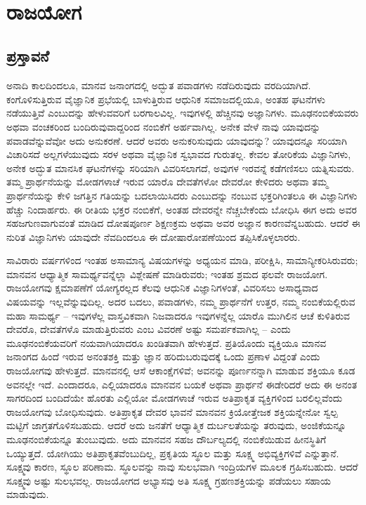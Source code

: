 

\newpage

~\thispagestyle{empty}

\newpage

\part{ರಾಜಯೋಗ}

\chapter{ಪ್ರಸ್ತಾವನೆ}

ಅನಾದಿ ಕಾಲದಿಂದಲೂ, ಮಾನವ ಜನಾಂಗದಲ್ಲಿ ಅದ್ಭುತ ಪವಾಡಗಳು ನಡೆದಿರುವುದು ವರದಿಯಾಗಿದೆ. ಕಂಗೊಳಿಸುತ್ತಿರುವ ವೈಜ್ಞಾನಿಕ ಪ್ರಭೆಯಲ್ಲಿ ಬಾಳುತ್ತಿರುವ ಆಧುನಿಕ ಸಮಾಜದಲ್ಲಿಯೂ, ಅಂತಹ ಘಟನೆಗಳು ನಡೆಯುತ್ತಿವೆ ಎಂಬುದನ್ನು ಹೇಳುವವರಿಗೆ ಬರಗಾಲವಿಲ್ಲ. ಇವುಗಳಲ್ಲಿ ಹೆಚ್ಚಿನವು ಅಜ್ಞಾನಿಗಳು. ಮೂಢನಂಬಿಕೆಯವರು ಅಥವಾ ವಂಚಕರಿಂದ ಬಂದಿರುವುವಾದ್ದರಿಂದ ನಂಬಿಕೆಗೆ ಅರ್ಹವಾಗಿಲ್ಲ. ಅನೇಕ ವೇಳೆ ನಾವು ಯಾವುದನ್ನು ಪವಾಡವೆನ್ನುವೆವೋ ಅದು ಅನುಕರಣೆ. ಆದರೆ ಅವರು ಅನುಕರಿಸುವುದು ಯಾವುದನ್ನು? ಯಾವುದನ್ನೂ ಸರಿಯಾಗಿ ವಿಚಾರಿಸದೆ ಅಲ್ಲಗಳೆಯುವುದು ಸರಳ ಅಥವಾ ವೈಜ್ಞಾನಿಕ ಸ್ವಭಾವದ ಗುರುತಲ್ಲ. ಕೇವಲ ತೋರಿಕೆಯ ವಿಜ್ಞಾನಿಗಳು, ಅನೇಕ ಅದ್ಭುತ ಮಾನಸಿಕ ಘಟನೆಗಳನ್ನು ಸರಿಯಾಗಿ ವಿವರಿಸಲಾಗದೆ, ಅವುಗಳ ಇರವನ್ನೆ ಕಡೆಗಣಿಸಲು ಯತ್ನಿಸುವರು. ತಮ್ಮ ಪ್ರಾರ್ಥನೆಯನ್ನು ಮೋಡಗಳಾಚೆ ಇರುವ ಯಾರೊ ದೇವತೆಗಳೋ ದೇವರೋ ಕೇಳಿದರು ಅಥವಾ ತಮ್ಮ ಪ್ರಾರ್ಥನೆಯನ್ನು ಕೇಳಿ ಜಗತ್ತಿನ ಗತಿಯನ್ನು ಬದಲಾಯಿಸಿದರು ಎಂಬುದನ್ನು ನಂಬುವ ಭಕ್ತರಿಗಿಂತಲೂ ಈ ವಿಜ್ಞಾನಿಗಳು ಹೆಚ್ಚು ನಿಂದಾರ್ಹರು. ಈ ರೀತಿಯ ಭಕ್ತರ ನಂಬಿಕೆಗೆ, ಅಂತಹ ದೇವರನ್ನೇ ನೆಚ್ಚಬೇಕೆಂದು ಬೋಧಿಸಿ ಈಗ ಅದು ಅವರ ಸಹಜಗುಣವಾಗುವಂತೆ ಮಾಡಿದ ದೋಷಪೂರ್ಣ ಶಿಕ್ಷಣಕ್ರಮ ಅಥವಾ ಅವರ ಅಜ್ಞಾನ ಕಾರಣವೆನ್ನಬಹುದು. ಆದರೆ ಈ ನುರಿತ ವಿಜ್ಞಾನಿಗಳು ಯಾವುದೇ ನೆವದಿಂದಲೂ ಈ ದೋಷಾರೋಪಣೆಯಿಂದ ತಪ್ಪಿಸಿಕೊಳ್ಳಲಾರರು. 

\vskip 5pt

ಸಾವಿರಾರು ವರ್ಷಗಳಿಂದ ಇಂತಹ ಅಸಾಮಾನ್ಯ ವಿಷಯಗಳನ್ನು ಅಧ್ಯಯನ ಮಾಡಿ, ಪರೀಕ್ಷಿಸಿ, ಸಾಮಾನ್ಯೀಕರಿಸಿರುವರು; ಮಾನವನ ಆಧ್ಯಾತ್ಮಿಕ ಸಾಮರ್ಥ್ಯವನ್ನೆಲ್ಲಾ ವಿಶ್ಲೇಷಣೆ ಮಾಡಿರುವರು; ಇಂತಹ ಶ್ರಮದ ಫಲವೇ ರಾಜಯೋಗ. ರಾಜಯೋಗವು ಕ್ಷಮಾಪಣೆಗೆ ಯೋಗ್ಯರಲ್ಲದ ಕೆಲವು ಆಧುನಿಕ ವಿಜ್ಞಾನಿಗಳಂತೆ, ವಿವರಿಸಲು ಅಸಾಧ್ಯವಾದ ವಿಷಯವನ್ನು ಇಲ್ಲವೆನ್ನುವುದಿಲ್ಲ. ಅದರ ಬದಲು, ಪವಾಡಗಳು, ನಮ್ಮ ಪ್ರಾರ್ಥನೆಗೆ ಉತ್ತರ, ನಮ್ಮ ನಂಬಿಕೆಯಲ್ಲಿರುವ ಮಹಾ ಸಾಮರ್ಥ್ಯ – ಇವುಗಳೆಲ್ಲ ವಾಸ್ತವಿಕವಾಗಿ ನಿಜವಾದರೂ ಇವುಗಳನ್ನೆಲ್ಲ ಯಾರೊ ಮುಗಿಲಿನ ಆಚೆ ಕುಳಿತಿರುವ ದೇವರೊ, ದೇವತೆಗಳೊ ಮಾಡುತ್ತಿರುವರು ಎಂಬ ವಿವರಣೆ ಅಷ್ಟು ಸಮರ್ಪಕವಾಗಿಲ್ಲ – ಎಂದು ಮೂಢನಂಬಿಕೆಯವರಿಗೆ ನಯವಾಗಿಯಾದರೂ ಖಂಡಿತವಾಗಿ ಹೇಳುತ್ತದೆ. ಪ್ರತಿಯೊಂದು ವ್ಯಕ್ತಿಯೂ ಮಾನವ ಜನಾಂಗದ ಹಿಂದೆ ಇರುವ ಅನಂತಶಕ್ತಿ ಮತ್ತು ಜ್ಞಾನ ಹರಿದುಬರುವುದಕ್ಕೆ ಒಂದು ಪ್ರಣಾಳ ವಿದ್ದಂತೆ ಎಂದು ರಾಜಯೋಗವು ಹೇಳುತ್ತದೆ. ಮಾನವನಲ್ಲಿ ಆಸೆ ಆಕಾಂಕ್ಷೆಗಳಿವೆ; ಅವನನ್ನು ಪೂರ್ಣನನ್ನಾಗಿ ಮಾಡುವ ಶಕ್ತಿಯೂ ಕೂಡ ಅವನಲ್ಲೇ ಇದೆ. ಎಂದಾದರೂ, ಎಲ್ಲಿಯಾದರೂ ಮಾನವನ ಬಯಕೆ ಅಥವಾ ಪ್ರಾರ್ಥನೆ ಈಡೇರಿದರೆ ಅದು ಈ ಅನಂತ ಸಾಗರದಿಂದ ಬಂದಿದೆಯೇ ಹೊರತು ಎಲ್ಲಿಯೋ ಮೋಡಗಳಾಚೆ ಇರುವ ಅತಿಪ್ರಾಕೃತ ವ್ಯಕ್ತಿಗಳಿಂದ ಬರಲಿಲ್ಲವೆಂದು ರಾಜಯೋಗವು ಬೋಧಿಸುವುದು. ಅತಿಪ್ರಾಕೃತ ದೇವರ ಭಾವನೆ ಮಾನವನ ಕ್ರಿಯೋತ್ತೇಜಕ ಶಕ್ತಿಯನ್ನೇನೋ ಸ್ವಲ್ಪ ಮಟ್ಟಿಗೆ ಜಾಗ್ರತಗೊಳಿಸಬಹುದು. ಆದರೆ ಅದು ಜನತೆಗೆ ಆಧ್ಯಾತ್ಮಿಕ ದುರ್ಬಲತೆಯನ್ನು ತರುವುದು, ಅಂಜಿಕೆಯನ್ನೂ ಮೂಢನಂಬಿಕೆಯನ್ನೂ ತುಂಬುವುದು. ಅದು ಮಾನವನ ಸಹಜ ದೌರ್ಬಲ್ಯದಲ್ಲಿ ನಂಬಿಕೆಯಿಡುವ ಹೀನಸ್ಥಿತಿಗೆ ಒಯ್ಯುತ್ತದೆ. ಯೋಗಿಯು ಅತಿಪ್ರಾಕೃತವೆಂಬುದಿಲ್ಲ, ಪ್ರಕೃತಿಯ ಸ್ಥೂಲ ಮತ್ತು ಸೂಕ್ಷ್ಮ ಅಭಿವ್ಯಕ್ತಿಗಳಿವೆ ಎನ್ನುತ್ತಾನೆ. ಸೂಕ್ಷ್ಮವು ಕಾರಣ, ಸ್ಥೂಲ ಪರಿಣಾಮ. ಸ್ಥೂಲವನ್ನು ನಾವು ಸುಲಭವಾಗಿ ಇಂದ್ರಿಯಗಳ ಮೂಲಕ ಗ್ರಹಿಸಬಹುದು. ಆದರೆ ಸೂಕ್ಷ್ಮವು ಅಷ್ಟು ಸುಲಭವಲ್ಲ. ರಾಜಯೋಗದ ಅಭ್ಯಾಸವು ಅತಿ ಸೂಕ್ಷ್ಮ ಗ್ರಹಣಶಕ್ತಿಯನ್ನು ಪಡೆಯಲು ಸಹಾಯ ಮಾಡುವುದು. 

